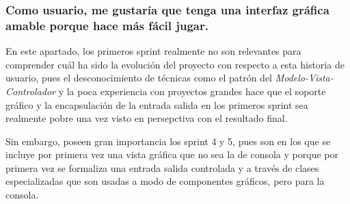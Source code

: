 \documentclass[12pt,a4paper,openright]{book}
\theoremstyle{break}
\begin{document}
\subsubsection{Como usuario, me gustaría que tenga una interfaz gráfica amable porque hace más fácil jugar.}
En este apartado, los primeros sprint realmente no son relevantes para comprender cuál ha sido la evolución del proyecto con respecto a esta historia de usuario, pues el desconocimiento de técnicas como el patrón del \textit{Modelo-Vista-Controlador} y la poca experiencia con proyectos grandes hace que el soporte gráfico y la encapsulación de la entrada salida en los primeros sprint sea realmente pobre una vez visto en persepctiva con el resultado final.

Sin embargo, poseen gran importancia los sprint 4 y 5, pues son en los que se incluye por primera vez una vista gráfica que no sea la de consola y porque por primera vez se formaliza una entrada salida controlada y a través de clases especializadas que son usadas a modo de componentes gráficos, pero para la consola.
\end{document}
